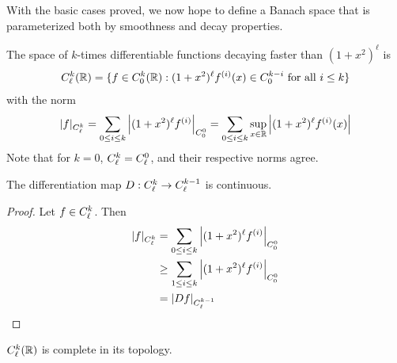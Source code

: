       With the basic cases proved, we now hope to define a Banach space that is parameterized both by smoothness and decay properties.
      \begin{defn}
        The space of $k$-times differentiable functions decaying faster than $(1+x^2)^\ell$ is
        \begin{align*}
          {C^k_\ell}(\mathbb{R}) = \{f\in {C^k_0}(\mathbb{R}):(1+x^2)^\ell f^{(i)}(x)\in C^{k-i}_0\text{ for all } i\le k\}
        \end{align*}
        with the norm
        \begin{align*}
          |f|_{C^k_\ell} = \sum_{0\le i\le k} \left|(1+x^2)^\ell f^{(i)}\right|_{C^0_0} = \sum_{0\le i\le k} \sup_{x\in\mathbb{R}} \left|(1+x^2)^\ell f^{(i)}(x)\right|
        \end{align*}
        Note that for $k=0$, ${C^k_\ell}={C^0_\ell}$, and their respective norms agree.
      \end{defn}
      \begin{claim}
        \label{claim:diffcontCkl}
        The differentiation map $D:{C^k_\ell}\rightarrow{C^{k-1}_\ell}$ is continuous.
        \begin{proof}
          Let $f\in{C^k_\ell}$.
          Then
          \begin{align*}
            |f|_{C^k_\ell}
            &= \sum_{0\le i\le k} \left| (1+x^2)^\ell f^{(i)} \right|_{C^0_0}
            \\&\ge \sum_{1\le i\le k} \left| (1+x^2)^\ell f^{(i)} \right|_{C^0_0}
            \\&= |Df|_{C^{k-1}_\ell}
          \end{align*}
        \end{proof}
      \end{claim}
      \begin{thm}
        \label{thm:cklcomplete}
        ${C^k_\ell}(\mathbb{R})$ is complete in its topology.
      \end{thm}
